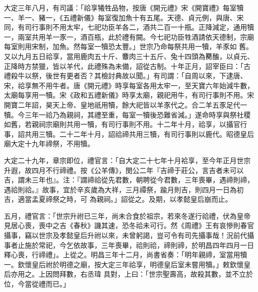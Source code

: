 \begin{pinyinscope}
 大定三年八月，有司議：「祫享犧牲品物，按唐《開元禮》宋《開寶禮》每室犢一、羊一、豬一，《五禮新儀》每室復加魚十有五尾。天德、貞元例，與唐、宋同，有司行事則不用太牢，七祀功臣羊各二，酒共二百一十瓶。正降減定，通用犢一，兩室共用羊一豕一，酒百瓶，此於禮有闕。今七祀功臣牲酒請依天德制，宗廟每室則用宋制，加魚。然每室一犢恐太豐。」世宗乃命每祭共用一犢，羊豕如
 舊。又以九月五日祫享，當用鹿肉五十斤、麞肉三十五斤、兔十四頭為臡醢，以貞元、正降時方禁獵，皆以羊代，此禮殊為未備，詔從古制。十年正月，詔宰臣曰：「古禮殺牛以祭，後世有更者否？其檢討典故以聞。」有司謂：「自周以來，下逮唐、宋，祫享無不用牛者。唐《開元禮》時享每室各用太牢一，至天寶六年始減牛數，太廟每享用一犢。宋《政和五禮新儀》時享太廟，親祀用牛，有司行事則不用。宋開寶二年詔，昊天上帝、皇地祇用犢，餘大祀皆以羊豕代之。合二羊五豕足代一犢。今三年一祫乃為親祠，其禮至重，每室一犢後恐難省減。」遂命時享與祭社稷
 如舊，若親祠宗廟則共用一犢，有司行事則不用。十二年十月，祫享，以攝官行事，詔共用三犢。二十二年十月，詔祫禘共用三犢，有司行事則以鹿代。昭德皇后廟大定十九年禘祭，不用犢。



 大定二十九年，章宗即位，禮官言：「自大定二十七年十月袷享，至今年正月世宗升遐，故四月不行禘禮。按《公羊傳》，閔公二年『吉禘于莊公，言吉者未可以吉，謂未三年也』。注：『謂禘祫從先君數，朝聘從今君數，三年喪畢，遇禘則禘，遇祫則祫。』故事，宜於辛亥歲為大祥，三月禫祭，踰月則吉，則四月一日為初吉，適當孟夏禘祭之時，可
 為親祠。」詔從之。及期，以孝懿皇后崩而止。



 五月，禮官言：「世宗升祔已三年，尚未合食於祖宗，若來冬遂行祫禮，伏為皇帝見居心喪，喪中之吉《春秋》譏其速，恐冬祫未可行。然《周禮》王有哀慘則春官攝事，竊以世宗及孝懿皇后升祔以來，未曾躬謁，豈可令有司先攝事哉！況前代攝事者止施於常祀，今乞依故事，三年喪畢，祫則祫，禘則禘，於明昌四年四月一日釋心喪，行禘禮」。上從之。明昌三年十二月，尚書省奏：「明年親禘，室當用犢一。欽懷皇后祔於明德之廟，按大定三年祫享，明德皇后室未嘗用犢。」敕欽懷皇后亦用之。上因問拜數，右丞瑋
 具對，上曰：「世宗聖壽高，故殺其數，並不立於位，今當從禮而已。」




\end{pinyinscope}
